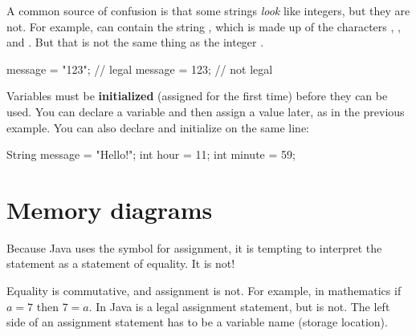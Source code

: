 
A common source of confusion is that some strings {\em look} like integers, but they are not.
For example,  can contain the string , which is made up of the characters , , and .
But that is not the same thing as the integer .

\begin{code}
message = "123";     // legal
message = 123;       // not legal
\end{code}


Variables must be {\bf initialized} (assigned for the first time) before they can be used.
You can declare a variable and then assign a value later, as in the previous example.
You can also declare and initialize on the same line:

\begin{code}
String message = "Hello!";
int hour = 11;
int minute = 59;
\end{code}

%
%
%


\section{Memory diagrams}
\label{state}

Because Java uses the \java{=} symbol for assignment, it is tempting to interpret the statement  as a statement of equality.
It is not!


Equality is commutative, and assignment is not.
For example, in mathematics if $a = 7$ then $7 = a$.
In Java  is a legal assignment statement, but  is not.
The left side of an assignment statement has to be a variable name (storage location).

